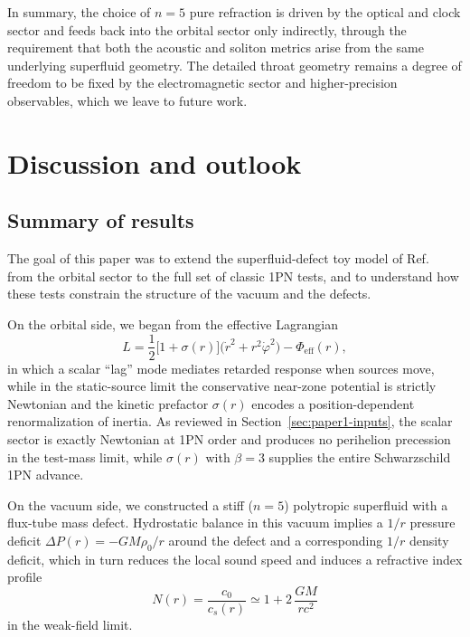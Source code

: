 \documentclass[11pt]{article}
\begin{document}
In summary, the choice of $n=5$ pure refraction is driven by the optical
and clock sector and feeds back into the orbital sector only indirectly,
through the requirement that both the acoustic and soliton metrics arise
from the same underlying superfluid geometry.
The detailed throat geometry remains a degree of freedom to be fixed by
the electromagnetic sector and higher-precision observables, which we
leave to future work.

\section{Discussion and outlook}
\label{sec:discussion}

\subsection{Summary of results}
\label{subsec:discussion-summary}

The goal of this paper was to extend the superfluid-defect toy model of
Ref.~\cite{Norris:2025Orbits} from the orbital sector to the full set of
classic 1PN tests, and to understand how these tests constrain the
structure of the vacuum and the defects.

On the orbital side, we began from the effective Lagrangian
\begin{equation}
  L
  = \frac{1}{2}\bigl[1 + \sigma(r)\bigr]
      \bigl(\dot r^2 + r^2 \dot\varphi^2\bigr)
    - \Phi_{\mathrm{eff}}(r),
\end{equation}
in which a scalar ``lag'' mode mediates retarded response when sources move,
while in the static-source limit the conservative near-zone potential is
strictly Newtonian and the kinetic prefactor $\sigma(r)$ encodes a
position-dependent renormalization of inertia.
As reviewed in Section~\ref{sec:paper1-inputs}, the scalar sector is
exactly Newtonian at 1PN order and produces no perihelion precession in the
test-mass limit, while $\sigma(r)$ with $\beta = 3$ supplies the entire
Schwarzschild 1PN advance.

On the vacuum side, we constructed a stiff ($n=5$) polytropic superfluid
with a flux-tube mass defect.
Hydrostatic balance in this vacuum implies a $1/r$ pressure deficit
$\Delta P(r) = -GM\rho_0/r$ around the defect and a corresponding $1/r$
density deficit, which in turn reduces the local sound speed and induces
a refractive index profile
\begin{equation}
  N(r)
  = \frac{c_0}{c_s(r)}
  \simeq 1 + 2\,\frac{GM}{r c^2}
\end{equation}
in the weak-field limit.
\end{document}
